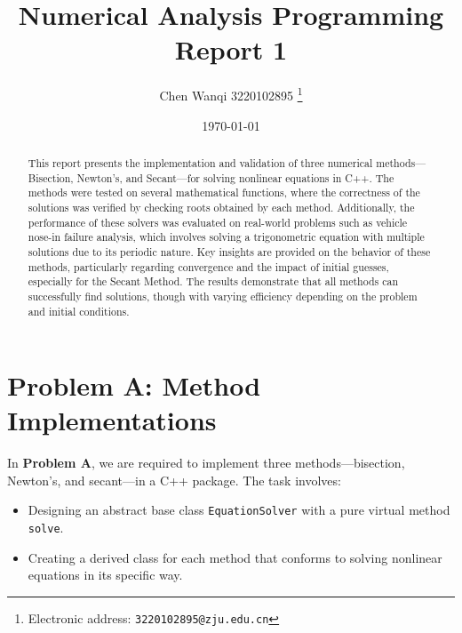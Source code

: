 \documentclass[a4paper]{article}
\begin{document}
\title{Numerical Analysis Programming Report 1}

\author{Chen Wanqi 3220102895
  \thanks{Electronic address: \texttt{3220102895@zju.edu.cn}}}

\date{\today}

\maketitle


\begin{abstract}
This report presents the implementation and validation of three numerical methods—Bisection, Newton's, and Secant—for solving nonlinear equations in C++. The methods were tested on several mathematical functions, where the correctness of the solutions was verified by checking roots obtained by each method. Additionally, the performance of these solvers was evaluated on real-world problems such as vehicle nose-in failure analysis, which involves solving a trigonometric equation with multiple solutions due to its periodic nature. Key insights are provided on the behavior of these methods, particularly regarding convergence and the impact of initial guesses, especially for the Secant Method. The results demonstrate that all methods can successfully find solutions, though with varying efficiency depending on the problem and initial conditions.
\end{abstract}


\section{Problem A: Method Implementations}

In \textbf{Problem A}, we are required to implement three methods—bisection, Newton's, and secant—in a C++ package. The task involves:

\begin{itemize}
    \item Designing an abstract base class \texttt{EquationSolver} with a pure virtual method \texttt{solve}.
    \item Creating a derived class for each method that conforms to solving nonlinear equations in its specific way.
\end{itemize}
\end{document}
